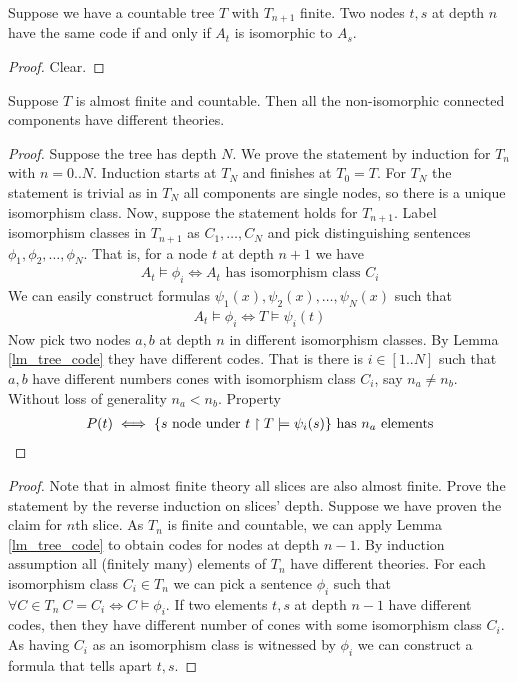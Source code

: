 \documentclass{amsart}
\begin{document}
\begin{Lemma} \label{lm_tree_code}
	Suppose we have a countable tree $T$ with $T_{n+1}$ finite. Two nodes $t,s$ at depth $n$ have the same code if and only if $A_t$ is isomorphic to $A_s$.
\end{Lemma}

\begin{proof}
	Clear.
\end{proof}

\begin{Lemma} \label{lm_categoricity}
	Suppose $T$ is almost finite and countable. Then all the non-isomorphic connected components have different theories.
\end{Lemma}

\begin{proof}
	Suppose the tree has depth $N$. We prove the statement by induction for $T_n$ with $n = 0..N$. Induction starts at $T_N$ and finishes at $T_0 = T$. For $T_N$ the statement is trivial as in $T_N$ all components are single nodes, so there is a unique isomorphism class. Now, suppose the statement holds for $T_{n+1}$. Label isomorphism classes in $T_{n+1}$ as $C_1, \ldots, C_N$ and pick distinguishing sentences $\phi_1, \phi_2, \ldots, \phi_N$. That is, for a node $t$ at depth $n+1$ we have 
	\begin{align*}
		A_t \models \phi_i \iff A_t \text{ has isomorphism class } C_i
	\end{align*}
	We can easily construct formulas $\psi_1(x), \psi_2(x), \ldots, \psi_N(x)$ such that
	\begin{align*}
		A_t \models \phi_i \iff T \models \psi_i(t)
	\end{align*}
	Now pick two nodes $a,b$ at depth $n$ in different isomorphism classes. By Lemma \ref{lm_tree_code} they have different codes. That is there is $i \in [1..N]$ such that $a,b$ have different numbers cones with isomorphism class $C_i$, say $n_a \neq n_b$. Without loss of generality $n_a < n_b$. Property
	\begin{align*}
		P(t) \iff \{s \text{ node under $t$} \upharpoonright T \models \psi_i(s)\} \text { has $n_a$ elements}
	\end{align*}
\end{proof}

\begin{proof}
	Note that in almost finite theory all slices are also almost finite. Prove the statement by the reverse induction on slices' depth. Suppose we have proven the claim for $n$th slice. As $T_n$ is finite and countable, we can apply Lemma \ref{lm_tree_code} to obtain codes for nodes at depth $n-1$. By induction assumption all (finitely many) elements of $T_n$ have different theories. For each isomorphism class $C_i \in T_n$ we can pick a sentence $\phi_i$ such that $\forall C \in T_n \  C = C_i \iff C \models \phi_i$. If two elements $t,s$ at depth $n-1$ have different codes, then they have different number of cones with some isomorphism class $C_i$. As having $C_i$ as an isomorphism class is witnessed by $\phi_i$ we can construct a formula that tells apart $t,s$.
\end{proof}
\end{document}
